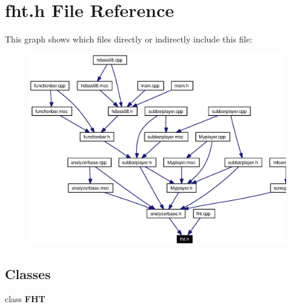 \section{fht.h File Reference}
\label{fht_8h}




This graph shows which files directly or indirectly include this file:\begin{figure}[H]
\begin{center}
\leavevmode
\includegraphics[width=365pt]{fht_8h__dep__incl}
\end{center}
\end{figure}
\subsection*{Classes}
\begin{CompactItemize}
\item 
class {\bf FHT}
\end{CompactItemize}
